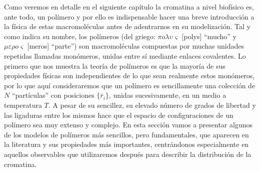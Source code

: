 Como veremos en detalle en el siguiente capítulo la cromatina a nivel biofísico es, ante todo, un polímero y por ello es indispensable hacer una breve introducción a la física de estas macromoléculas antes de adentrarnos en su modelización. Tal y como indica su nombre, los polímeros (del griego: $\pi o \lambda \upsilon \varsigma$ [polys] ``mucho'' y $\mu \varepsilon \rho o \varsigma$ [meros] ``parte'') son macromoléculas compuestas por muchas unidades repetidas llamadas monómeros, unidas entre sí mediante enlaces covalentes. Lo primero que nos muestra la teoría de polímeros es que la mayoría de sus propiedades físicas son independientes de lo que sean realmente estos monómeros, por lo que aquí consideraremos que un polímero es sencillamente una colección de $N$ ``partículas'' con posiciones $\{\bar{r}_i\}$, unidas sucesivamente, en un medio a temperatura $T$. A pesar de su sencillez, su elevado número de grados de libertad y las ligaduras entre los mismos hace que el espacio de configuraciones de un polímero sea muy extenso y complejo. En esta sección vamos a presentar algunos de los modelos de polímeros más sencillos, pero fundamentales, que aparecen en la literatura y sus propiedades más importantes, centrándonos especialmente en aquellos observables que utilizaremos después para describir la distribución de la cromatina.

